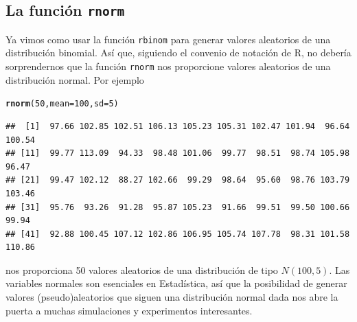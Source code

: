\documentclass[10pt,a4paper]{article}\usepackage[]{graphicx}\usepackage[]{color}
\makeatletter
\newcommand{\hlnum}[1]{\textcolor[rgb]{0.686,0.059,0.569}{#1}}%
\newcommand{\hlstd}[1]{\textcolor[rgb]{0.345,0.345,0.345}{#1}}%
\newcommand{\hlkwc}[1]{\textcolor[rgb]{0.333,0.667,0.333}{#1}}%
\newcommand{\hlkwd}[1]{\textcolor[rgb]{0.737,0.353,0.396}{\textbf{#1}}}%
\newenvironment{kframe}{%
 \def\at@end@of@kframe{}%
 \ifinner\ifhmode%
  \def\at@end@of@kframe{\end{minipage}}%
  \begin{minipage}{\columnwidth}%
 \fi\fi%
 \def\FrameCommand##1{\hskip\@totalleftmargin \hskip-\fboxsep
 \colorbox{shadecolor}{##1}\hskip-\fboxsep
     \hskip-\linewidth \hskip-\@totalleftmargin \hskip\columnwidth}%
 \MakeFramed {\advance\hsize-\width
   \@totalleftmargin\z@ \linewidth\hsize
   \@setminipage}}%
 {\par\unskip\endMakeFramed%
 \at@end@of@kframe}
\newenvironment{knitrout}{}{} %
\makeatother
\begin{document}
\subsection{La función {\tt rnorm}}
\label{tut05:subsec:qnorm}

Ya vimos como usar la función {\tt rbinom} para generar valores aleatorios de una distribución binomial. Así que, siguiendo el convenio de notación de R, no debería sorprendernos que la función {\tt rnorm} nos proporcione valores aleatorios de una distribución normal. Por ejemplo
\begin{knitrout}
\color{fgcolor}\begin{kframe}
\begin{alltt}
    \hlkwd{rnorm}\hlstd{(}\hlnum{50}\hlstd{,}\hlkwc{mean}\hlstd{=}\hlnum{100}\hlstd{,}\hlkwc{sd}\hlstd{=}\hlnum{5}\hlstd{)}
\end{alltt}
\begin{verbatim}
##  [1]  97.66 102.85 102.51 106.13 105.23 105.31 102.47 101.94  96.64 100.54
## [11]  99.77 113.09  94.33  98.48 101.06  99.77  98.51  98.74 105.98  96.47
## [21]  99.47 102.12  88.27 102.66  99.29  98.64  95.60  98.76 103.79 103.46
## [31]  95.76  93.26  91.28  95.87 105.23  91.66  99.51  99.50 100.66  99.94
## [41]  92.88 100.45 107.12 102.86 106.95 105.74 107.78  98.31 101.58 110.86
\end{verbatim}
\end{kframe}
\end{knitrout}
nos proporciona 50 valores aleatorios de una distribución de tipo $N(100,5)$. Las variables normales son esenciales en Estadística, así que la posibilidad de generar valores (pseudo)aleatorios que siguen una distribución normal dada nos abre la puerta a muchas simulaciones y experimentos interesantes.
\end{document}
